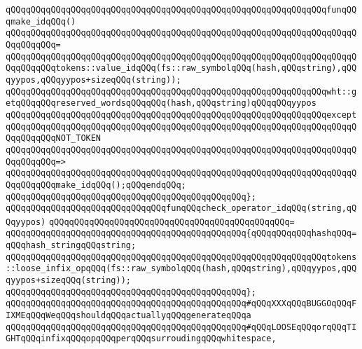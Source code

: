 \newline
\verb|qQQqqQQqqQQqqQQqqQQqqQQqqQQqqQQqqQQqqQQqqQQqqQQqqQQqqQQqqQQqqQQqfunqQQqmake_idqQQq()|\newline
\verb|qQQqqQQqqQQqqQQqqQQqqQQqqQQqqQQqqQQqqQQqqQQqqQQqqQQqqQQqqQQqqQQqqQQqqQQqqQQqqQQq=|\newline
\verb|qQQqqQQqqQQqqQQqqQQqqQQqqQQqqQQqqQQqqQQqqQQqqQQqqQQqqQQqqQQqqQQqqQQqqQQqqQQqqQQqtokens::value_idqQQq(fs::raw_symbolqQQq(hash,qQQqstring),qQQqyypos,qQQqyypos+sizeqQQq(string));|\newline
\newline
\verb|qQQqqQQqqQQqqQQqqQQqqQQqqQQqqQQqqQQqqQQqqQQqqQQqqQQqqQQqqQQqqQQqwht::getqQQqqQQqreserved_wordsqQQqqQQq(hash,qQQqstring)qQQqqQQqyypos|\newline
\verb|qQQqqQQqqQQqqQQqqQQqqQQqqQQqqQQqqQQqqQQqqQQqqQQqqQQqqQQqqQQqqQQqexcept|\newline
\verb|qQQqqQQqqQQqqQQqqQQqqQQqqQQqqQQqqQQqqQQqqQQqqQQqqQQqqQQqqQQqqQQqqQQqqQQqqQQqqQQqNOT_TOKEN|\newline
\verb|qQQqqQQqqQQqqQQqqQQqqQQqqQQqqQQqqQQqqQQqqQQqqQQqqQQqqQQqqQQqqQQqqQQqqQQqqQQqqQQq=>|\newline
\verb|qQQqqQQqqQQqqQQqqQQqqQQqqQQqqQQqqQQqqQQqqQQqqQQqqQQqqQQqqQQqqQQqqQQqqQQqqQQqqQQqmake_idqQQq();qQQqendqQQq;|\newline
\verb|qQQqqQQqqQQqqQQqqQQqqQQqqQQqqQQqqQQqqQQqqQQqqQQq};|\newline
\newline
\verb|qQQqqQQqqQQqqQQqqQQqqQQqqQQqqQQqfunqQQqcheck_operator_idqQQq(string,qQQqyypos)|\newline
\verb|qQQqqQQqqQQqqQQqqQQqqQQqqQQqqQQqqQQqqQQqqQQqqQQq=|\newline
\verb|qQQqqQQqqQQqqQQqqQQqqQQqqQQqqQQqqQQqqQQqqQQqqQQq{qQQqqQQqqQQqhashqQQq=qQQqhash_stringqQQqstring;|\newline
\newline
\verb|qQQqqQQqqQQqqQQqqQQqqQQqqQQqqQQqqQQqqQQqqQQqqQQqqQQqqQQqqQQqqQQqtokens::loose_infix_opqQQq(fs::raw_symbolqQQq(hash,qQQqstring),qQQqyypos,qQQqyypos+sizeqQQq(string));|\newline
\verb|qQQqqQQqqQQqqQQqqQQqqQQqqQQqqQQqqQQqqQQqqQQqqQQq};|\newline
\newline
\verb|qQQqqQQqqQQqqQQqqQQqqQQqqQQqqQQqqQQqqQQqqQQqqQQq#qQQqXXXqQQqBUGGOqQQqFIXMEqQQqWeqQQqshouldqQQqactuallyqQQqgenerateqQQqa|\newline
\verb|qQQqqQQqqQQqqQQqqQQqqQQqqQQqqQQqqQQqqQQqqQQqqQQq#qQQqLOOSEqQQqorqQQqTIGHTqQQqinfixqQQqopqQQqperqQQqsurroudingqQQqwhitespace,|\newline
